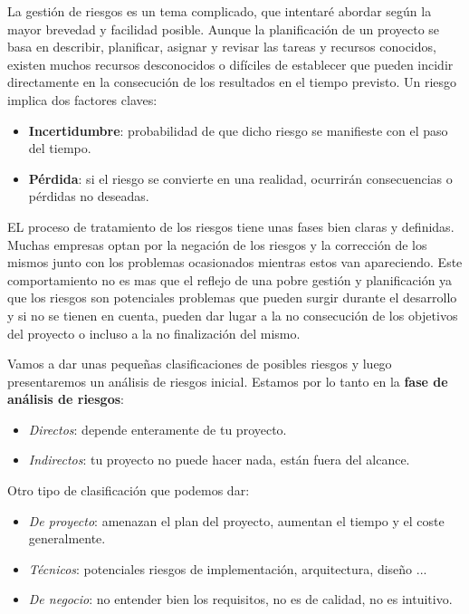 La gestión de riesgos es un tema complicado, que intentaré abordar según la mayor brevedad y facilidad posible. Aunque la planificación de un proyecto se basa en describir, planificar, asignar y revisar las tareas y recursos conocidos, existen muchos recursos desconocidos o difíciles de establecer que pueden incidir directamente en la consecución de los resultados en el tiempo previsto. Un riesgo implica dos factores claves:
\begin{itemize}
\item \textbf{Incertidumbre}: probabilidad de que dicho riesgo se manifieste con el paso del tiempo.
\item \textbf{Pérdida}: si el riesgo se convierte en una realidad, ocurrirán consecuencias o pérdidas no deseadas.
\end{itemize}

EL proceso de tratamiento de los riesgos tiene unas fases bien claras y definidas. Muchas empresas optan por la negación de los riesgos y la corrección de los mismos junto con los problemas ocasionados mientras estos van apareciendo. Este comportamiento no es mas que el reflejo de una pobre gestión y planificación ya que los riesgos son potenciales problemas que pueden surgir durante el desarrollo y si no se tienen en cuenta, pueden dar lugar a la no consecución de los objetivos del proyecto o incluso a la no finalización del mismo.

Vamos a dar unas pequeñas clasificaciones de posibles riesgos y luego presentaremos un análisis de riesgos inicial. Estamos por lo tanto en la \textbf{fase de análisis de riesgos}: 
\begin{itemize}
\item \textit{Directos}: depende enteramente de tu proyecto.
\item \textit{Indirectos}: tu proyecto no puede hacer nada, están fuera del alcance. 
\end{itemize}

Otro tipo de clasificación que podemos dar:
\begin{itemize}
\item \textit{De proyecto}: amenazan el plan del proyecto, aumentan el tiempo y el coste generalmente.
\item \textit{Técnicos}: potenciales riesgos de implementación, arquitectura, diseño ...
\item \textit{De negocio}: no entender bien los requisitos, no es de calidad, no es intuitivo. 
\end{itemize}

